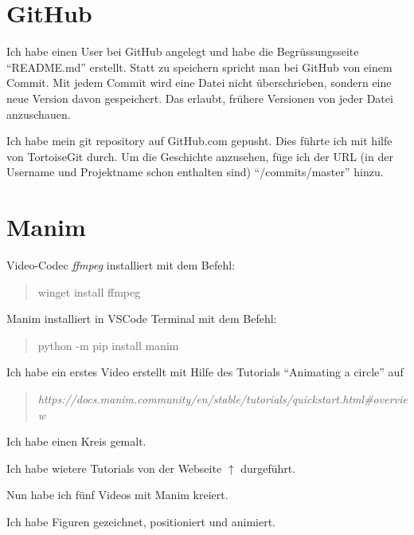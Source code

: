 \documentclass[a4paper]{article} %
\begin{document}
    \section{GitHub} %
  
    Ich habe einen User bei GitHub angelegt 
    und habe die Begrüssungsseite ``README.md'' erstellt.
    Statt zu speichern spricht man bei GitHub von einem Commit.
    Mit jedem Commit wird eine Datei nicht überschrieben,
    sondern eine neue Version davon gespeichert.
    Das erlaubt, frühere Versionen von jeder Datei anzuschauen.
    
    Ich habe mein git repository auf GitHub.com gepusht.
    Dies führte ich mit hilfe von TortoiseGit durch.
    Um die Geschichte anzusehen, füge ich der URL (in der Username und Projektname schon 
    enthalten sind) ``/commits/master'' hinzu.
      
    \section{Manim} %

    Video-Codec \textsl{ffmpeg} installiert mit dem Befehl:
    \begin{quote}
        winget install ffmpeg
    \end{quote}
   
    Manim installiert in VSCode Terminal mit dem Befehl:
    \begin{quote}
        python -m pip install manim
    \end{quote}
    
    Ich habe ein erstes Video erstellt mit Hilfe des Tutorials 
    ``Animating a circle'' auf
    \begin{quote}
        \textsl{https://docs.manim.community/en/stable/tutorials/quickstart.html\#overview}
    \end{quote}

    Ich habe einen Kreis gemalt.

    Ich habe wietere Tutorials von der Webseite $\uparrow$ durgeführt.
    
    Nun habe ich fünf Videos mit Manim kreiert.
    
    Ich habe Figuren gezeichnet, positioniert und animiert.
\end{document}
